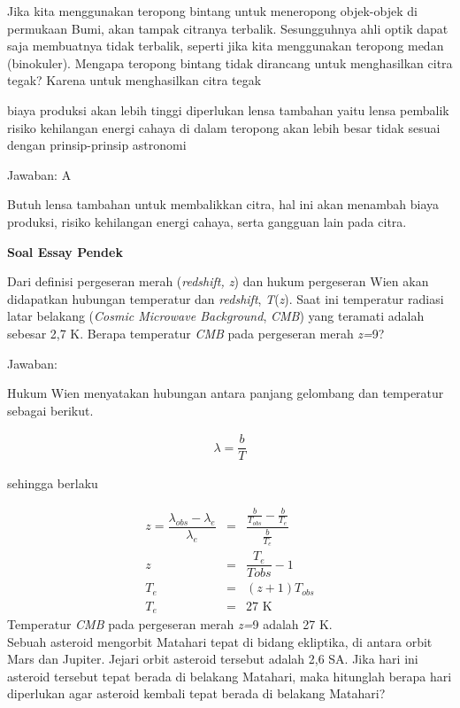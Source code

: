 \documentclass[11pt,fleqn]{exam}
\begin{document}
\begin{questions}
{\question Jika kita menggunakan teropong bintang untuk meneropong objek-objek di permukaan Bumi, akan tampak citranya terbalik. Sesungguhnya ahli optik dapat saja membuatnya tidak terbalik, seperti jika kita menggunakan teropong medan (binokuler). Mengapa teropong bintang tidak dirancang untuk menghasilkan citra tegak? Karena untuk menghasilkan citra tegak 
\begin{choices}
\choice biaya produksi akan lebih tinggi
\choice diperlukan lensa tambahan yaitu lensa pembalik
\choice risiko kehilangan energi cahaya di dalam teropong akan lebih besar
\choice tidak sesuai dengan prinsip-prinsip astronomi
\end{choices}

Jawaban: A

Butuh lensa tambahan untuk membalikkan citra, hal ini akan menambah biaya produksi, risiko kehilangan energi cahaya, serta gangguan lain pada citra. \\
}%


\newpage
\textbf{Soal Essay Pendek}

\question Dari definisi pergeseran merah (\textit{redshift, z}) dan hukum pergeseran Wien akan didapatkan hubungan temperatur dan \textit{redshift}, \textit{T}(\textit{z}). Saat ini temperatur radiasi latar belakang (\textit{Cosmic Microwave Background}, \textit{CMB}) yang teramati adalah sebesar 2,7 K. Berapa temperatur \textit{CMB} pada pergeseran merah \textit{z=}9?

Jawaban:

Hukum Wien menyatakan hubungan antara panjang gelombang dan temperatur sebagai berikut.

\begin{eqnarray*}
\lambda=\dfrac{b}{T}
\end{eqnarray*}

sehingga berlaku

\begin{eqnarray*}
z=\dfrac{\lambda_{obs}-\lambda_e}{\lambda_e}&=&\dfrac{\frac{b}{T_{obs}}-\frac{b}{T_e}}{\frac{b}{T_e}}\\
z&=&\dfrac{T_e}{T{obs}}-1\\
T_e&=&(z+1)T_{obs}\\
T_e&=&27 \text{   K}
\end{eqnarray*}
Temperatur \textit{CMB} pada pergeseran merah \textit{z=}9 adalah 27 K.\\


\question Sebuah asteroid mengorbit Matahari tepat di bidang ekliptika, di antara orbit Mars dan Jupiter. Jejari orbit asteroid tersebut adalah 2,6 SA. Jika hari ini asteroid tersebut tepat berada di belakang Matahari, maka hitunglah berapa hari diperlukan agar asteroid kembali tepat berada di belakang Matahari?


\end{questions}
\end{document}
